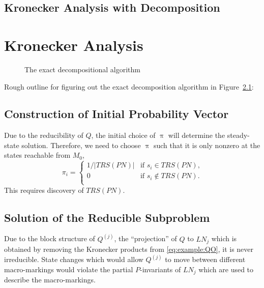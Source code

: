 \documentclass[a4paper,11pt,twoside,openright]{memoir}
\newcommand*{\PN}{\textit{PN}}
\newcommand*{\LN}{\textit{LN}}
\renewcommand*{\vec}[1]{\boldsymbol{\mathrm{#1}}}
\newcommand*{\TRS}{\textit{TRS}}
\theoremstyle{my}
\begin{document}
\section{Kronecker Analysis with Decomposition}

\chapter{Kronecker Analysis}

\begin{figure}
  {\centering
    
    \par}
  \caption{The exact decompositional algorithm}
  \label{fig:kronecker:flowchart}
\end{figure}

Rough outline for figuring out the exact decomposition algorithm
\citep{bao2008decompositional} in Figure~\ref{fig:kronecker:flowchart}:

\section{Construction of Initial Probability Vector}

Due to the reducibility of $Q$, the initial choice of $\vec{\uppi}$ will
determine the steady-state solution. Therefore, we need to choose
$\vec{\uppi}$ such that it is only nonzero at the states reachable from
$M_0$,
\begin{equation}
  \pi_i = \begin{cases}
    1 / \lvert \TRS(\PN) \rvert & \text{if $s_i \in \TRS(\PN)$,} \\
    0 & \text{if $s_i \notin \TRS(\PN)$.} \\
  \end{cases}
\end{equation}
This requires discovery of $\TRS(\PN)$.

\section{Solution of the Reducible Subproblem}

Due to the block structure of $Q^{(j)}$, the ``projection'' of $Q$ to
$\LN_j$ which is obtained by removing the Kronecker products from
\eqref{eq:example:QO}, it is never irreducible. State changes which
would allow $Q^{(j)}$ to move between different macro-markings would violate
the partial $P$-invariants of $\LN_j$ which are used to describe the
macro-markings.
\end{document}
